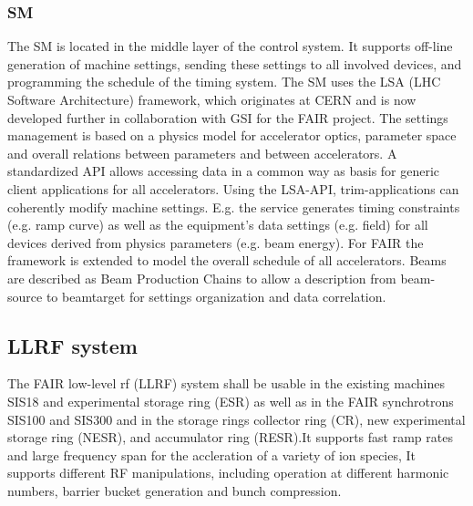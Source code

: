 \subsubsection{SM}
The SM is located in the middle layer of the control system. It supports off-line generation of machine settings, sending these settings to all involved devices,
and programming the schedule of the timing system. The SM uses the LSA (LHC Software Architecture) framework, which originates at CERN and is now developed further in collaboration with GSI for the FAIR project. The settings management is based on a physics model for accelerator optics, parameter space and overall relations between parameters and between accelerators. A standardized API allows accessing data in a common way as basis for generic client applications for all accelerators. Using the LSA-API, trim-applications can coherently modify machine settings. E.g. the service generates timing constraints (e.g. ramp curve) as well as the equipment’s data settings (e.g. field) for all devices derived from physics parameters (e.g. beam energy). For FAIR the framework is extended to model the overall schedule of all accelerators. Beams are described as Beam Production
Chains to allow a description from beam-source to beamtarget for settings organization and data correlation.

\subsection{LLRF system}
The FAIR low-level rf (LLRF) system shall be usable in the existing machines SIS18 and experimental storage ring (ESR) as well as in the FAIR synchrotrons SIS100 and SIS300 and in the storage rings collector ring (CR), new experimental storage ring (NESR), and accumulator ring (RESR).It supports fast ramp rates and large frequency span for the accleration of a variety of ion species, It supports different RF manipulations, including operation at different harmonic numbers, barrier bucket generation and bunch compression. 

